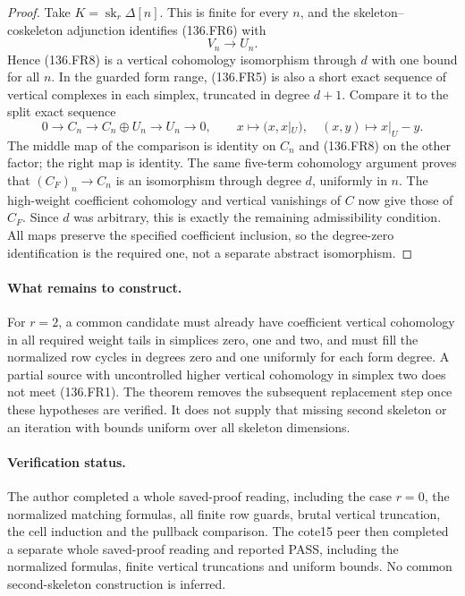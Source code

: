 \begin{proof}
Take \(K=\operatorname{sk}_r\Delta[n]\). This is finite
for every \(n\), and the skeleton--coskeleton adjunction
identifies (136.FR6) with
\[
                                V_n\longrightarrow U_n.
                                                        \tag{136.FR8}
\]
Hence (136.FR8) is a vertical cohomology isomorphism through
\(d\) with one bound for all \(n\). In the guarded form
range, (136.FR5) is also a short exact sequence of vertical
complexes in each simplex, truncated in degree \(d+1\).
Compare it to the split exact sequence
\[
 0\longrightarrow C_n\longrightarrow C_n\oplus U_n
                 \longrightarrow U_n\longrightarrow0,
 \qquad x\longmapsto(x,x|_U),\quad (x,y)\longmapsto x|_U-y.
                                                        \tag{136.FR9}
\]
The middle map of the comparison is identity on \(C_n\)
and (136.FR8) on the other factor; the right map is identity.
The same five-term cohomology argument proves that
\((C_F)_n\to C_n\) is an isomorphism through degree
\(d\), uniformly in \(n\). The high-weight coefficient
cohomology and vertical vanishings of \(C\) now give those
of \(C_F\). Since \(d\) was arbitrary, this is exactly
the remaining admissibility condition. All maps preserve the
specified coefficient inclusion, so the degree-zero identification
is the required one, not a separate abstract isomorphism.
\end{proof}

\paragraph{What remains to construct.}
For \(r=2\), a common candidate must already have coefficient
vertical cohomology in all required weight tails in simplices
zero, one and two, and must fill the normalized row cycles in
degrees zero and one uniformly for each form degree. A partial
source with uncontrolled higher vertical cohomology in simplex
two does not meet (136.FR1). The theorem removes the subsequent
replacement step once these hypotheses are verified. It does
not supply that missing second skeleton or an iteration with
bounds uniform over all skeleton dimensions.

\paragraph{Verification status.}
The author completed a whole saved-proof reading, including
the case \(r=0\), the normalized matching formulas, all finite
row guards, brutal vertical truncation, the cell induction and
the pullback comparison. The cote15 peer then completed a separate whole saved-proof
reading and reported PASS, including the normalized formulas,
finite vertical truncations and uniform bounds. No common
second-skeleton construction is inferred.
